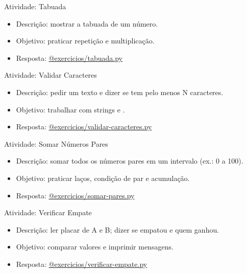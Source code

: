 \documentclass[aspectratio=169]{beamer}
\let\texttt\textttblue
\begin{document}
\begin{frame}{Atividade: Tabuada}
  \begin{itemize}
    \item Descrição: mostrar a tabuada de um número.
    \item Objetivo: praticar repetição e multiplicação.
    \item Resposta: \href{https://github.com/claudioscheer/exercicios-iniciantes-python/blob/master/exercicios/tabuada.py}{@exercicios/tabuada.py}
  \end{itemize}
\end{frame}

\begin{frame}{Atividade: Validar Caracteres}
  \begin{itemize}
    \item Descrição: pedir um texto e dizer se tem pelo menos N caracteres.
    \item Objetivo: trabalhar com strings e \texttt{len}.
    \item Resposta: \href{https://github.com/claudioscheer/exercicios-iniciantes-python/blob/master/exercicios/validar-caracteres.py}{@exercicios/validar-caracteres.py}
  \end{itemize}
\end{frame}

\begin{frame}{Atividade: Somar Números Pares}
  \begin{itemize}
    \item Descrição: somar todos os números pares em um intervalo (ex.: 0 a 100).
    \item Objetivo: praticar laços, condição de par e acumulação.
    \item Resposta: \href{https://github.com/claudioscheer/exercicios-iniciantes-python/blob/master/exercicios/somar-pares.py}{@exercicios/somar-pares.py}
  \end{itemize}
\end{frame}

\begin{frame}{Atividade: Verificar Empate}
  \begin{itemize}
    \item Descrição: ler placar de A e B; dizer se empatou e quem ganhou.
    \item Objetivo: comparar valores e imprimir mensagens.
    \item Resposta: \href{https://github.com/claudioscheer/exercicios-iniciantes-python/blob/master/exercicios/verificar-empate.py}{@exercicios/verificar-empate.py}
  \end{itemize}
\end{frame}
\end{document}
